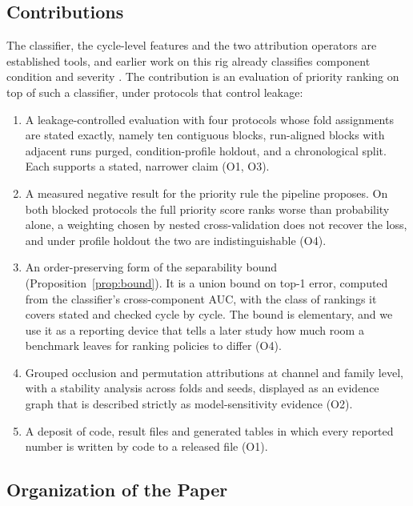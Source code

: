 \documentclass[journal]{IEEEtran}
\begin{document}
\subsection{Contributions}
\label{sec:contributions}

The classifier, the cycle-level features and the two attribution operators are
established tools, and earlier work on this rig already classifies component
condition and severity \cite{Helwig2015Hydraulic,Schneider2017FeatureExtraction}.
The contribution is an evaluation of priority ranking on top of such a
classifier, under protocols that control leakage:
\begin{enumerate}
    \item A leakage-controlled evaluation with four protocols whose fold
    assignments are stated exactly, namely ten contiguous blocks, run-aligned blocks
    with adjacent runs purged, condition-profile holdout, and a chronological split.
    Each supports a stated, narrower claim (O1, O3).
    \item A measured negative result for the priority rule the pipeline proposes.
    On both blocked protocols the full priority score ranks worse than probability
    alone, a weighting chosen by nested cross-validation does not recover the loss,
    and under profile holdout the two are indistinguishable (O4).
    \item An order-preserving form of the separability bound
    (Proposition~\ref{prop:bound}). It is a union bound on top-1 error, computed
    from the classifier's cross-component AUC, with the class of rankings it covers
    stated and checked cycle by cycle. The bound is elementary, and we use it as a
    reporting device that tells a later study how much room a benchmark leaves for
    ranking policies to differ (O4).
    \item Grouped occlusion and permutation attributions at channel and family
    level, with a stability analysis across folds and seeds, displayed as an
    evidence graph that is described strictly as model-sensitivity evidence (O2).
    \item A deposit of code, result files and generated tables in which every
    reported number is written by code to a released file (O1).
\end{enumerate}

\subsection{Organization of the Paper}
\label{sec:organization}
\end{document}

